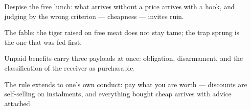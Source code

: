 

\begin{distilled}
  \item Despise the free lunch: what arrives without a price arrives with a hook, and judging by the wrong criterion --- cheapness --- invites ruin.
  \item The fable: the tiger raised on free meat does not stay tame; the trap sprung is the one that was fed first.
  \item Unpaid benefits carry three payloads at once: obligation, disarmament, and the classification of the receiver as purchasable.
  \item The rule extends to one's own conduct: pay what you are worth --- discounts are self-selling on instalments, and everything bought cheap arrives with advice attached.
\end{distilled}

